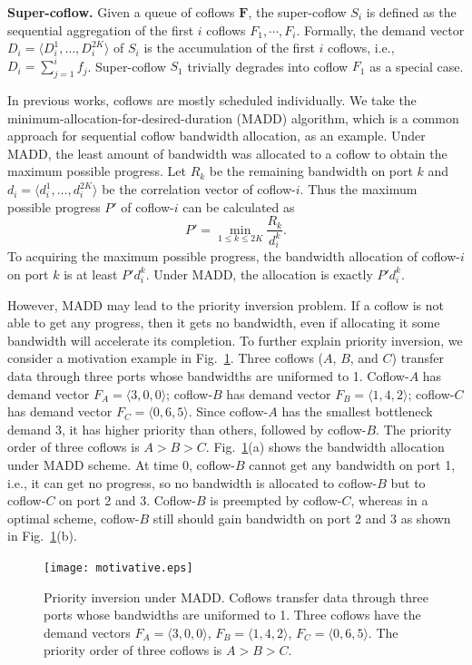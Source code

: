 \documentclass[10pt, conference, letterpaper]{IEEEtran}
\begin{document}
\noindent \textbf{Super-coflow.} Given a queue of coflows $\mathbf{F}$, the super-coflow $S_i$ is defined as the sequential aggregation of the first $i$ coflows $F_1,\cdots,F_i$. Formally, the demand vector $D_i = \langle D_i^1,\dots,D_i^{2K} \rangle$ of $S_i$ is the accumulation of the first $i$ coflows, i.e., $D_i = \sum_{j=1}^if_j$. Super-coflow $S_1$ trivially degrades into coflow $F_1$ as a special case.

In previous works, coflows are mostly scheduled individually. We take the minimum-allocation-for-desired-duration (MADD) algorithm, which is a common approach for sequential coflow bandwidth allocation, as an example\cite{varys, orchestra}. Under MADD, the least amount of bandwidth was allocated to a coflow to obtain the maximum possible progress. Let $R_k$ be the remaining bandwidth on port $k$ and $d_i=\langle d_i^1,\dots,d_i^{2K}\rangle$ be the correlation vector of coflow-$i$. Thus the maximum possible progress $P'$ of coflow-$i$ can be calculated as
\begin{equation}
	P' = \min_{1\leq k \leq 2K}\frac{R_k}{d_i^k}.
\end{equation}
To acquiring the maximum possible progress, the bandwidth allocation of coflow-$i$ on port $k$ is at least $P'd_i^k$. Under MADD, the allocation is exactly $P'd_i^k$. 

However, MADD may lead to the priority inversion problem. If a coflow is not able to get any progress, then it gets no bandwidth, even if allocating it some bandwidth will accelerate its completion. To further explain priority inversion, we consider a motivation example in Fig.~\ref{motivative}. Three coflows ($A$, $B$, and $C$) transfer data through three ports whose bandwidths are uniformed to 1. Coflow-$A$ has demand vector $F_A=\langle 3,0,0\rangle$; coflow-$B$ has demand vector $F_B=\langle 1,4,2\rangle$; coflow-$C$ has demand vector $F_C=\langle 0,6,5\rangle$. Since coflow-$A$ has the smallest bottleneck demand 3, it has higher priority than others, followed by coflow-$B$. The priority order of three coflows is $A > B > C$. Fig.~\ref{motivative}(a) shows the bandwidth allocation under MADD scheme. At time 0, coflow-$B$ cannot get any bandwidth on port 1, i.e., it can get no progress, so no bandwidth is allocated to coflow-$B$ but to coflow-$C$ on port 2 and 3. Coflow-$B$ is preempted by coflow-$C$, whereas in a optimal scheme, coflow-$B$ still should gain bandwidth on port 2 and 3 as shown in Fig.~\ref{motivative}(b).

\begin{figure}[!t]
	\centering\texttt{[image: motivative.eps]}
	\caption{Priority inversion under MADD. Coflows transfer data through three ports whose bandwidths are uniformed to 1. Three coflows have the demand vectors $F_A=\langle 3,0,0\rangle$, $F_B=\langle 1,4,2\rangle$, $F_C=\langle 0,6,5\rangle$. The priority order of three coflows is $A > B > C$.}\label{motivative}
\end{figure}
\end{document}
